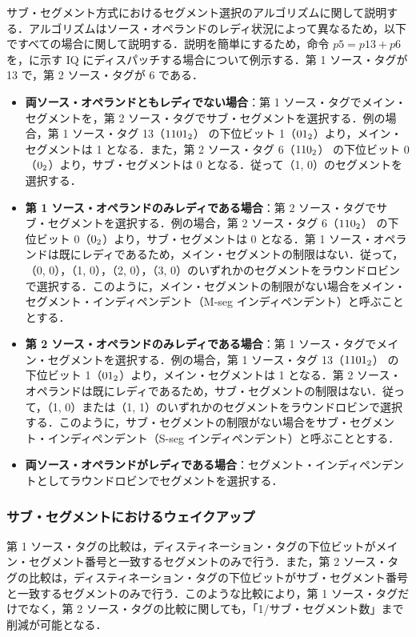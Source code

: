 サブ・セグメント方式におけるセグメント選択のアルゴリズムに関して説明する．アルゴリズムはソース・オペランドのレディ状況によって異なるため，以下ですべての場合に関して説明する．説明を簡単にするため，命令 $p5 = p13 + p6$ を，に示す IQ にディスパッチする場合について例示する．第 1 ソース・タグが 13 で，第 2 ソース・タグが 6 である．
\begin{itemize}
  \item \textbf{両ソース・オペランドともレディでない場合}：第 1 ソース・タグでメイン・セグメントを，第 2 ソース・タグでサブ・セグメントを選択する．例の場合，第 1 ソース・タグ 13（${\rm 1101_2}$） の下位ビット 1（${\rm 01_2}$）より，メイン・セグメントは 1 となる．また，第 2 ソース・タグ 6（${\rm 110_2}$） の下位ビット 0（${\rm 0_2}$）より，サブ・セグメントは 0 となる．従って（1, 0）のセグメントを選択する． 
  \item \textbf{第 1 ソース・オペランドのみレディである場合}：第 2 ソース・タグでサブ・セグメントを選択する．例の場合，第 2 ソース・タグ 6（${\rm 110_2}$） の下位ビット 0（${\rm 0_2}$）より，サブ・セグメントは 0 となる．第 1 ソース・オペランドは既にレディであるため，メイン・セグメントの制限はない．従って，（0, 0），（1, 0），（2, 0），（3, 0）のいずれかのセグメントをラウンドロビンで選択する．このように，メイン・セグメントの制限がない場合をメイン・セグメント・インディペンデント（M-seg インディペンデント）と呼ぶこととする．
  \item \textbf{第 2 ソース・オペランドのみレディである場合}：第 1 ソース・タグでメイン・セグメントを選択する．例の場合，第 1 ソース・タグ 13（${\rm 1101_2}$） の下位ビット 1（${\rm 01_2}$）より，メイン・セグメントは 1 となる．第 2 ソース・オペランドは既にレディであるため，サブ・セグメントの制限はない．従って，（1, 0）または（1, 1）のいずれかのセグメントをラウンドロビンで選択する．このように，サブ・セグメントの制限がない場合をサブ・セグメント・インディペンデント（S-seg インディペンデント）と呼ぶこととする．
  \item \textbf{両ソース・オペランドがレディである場合}：セグメント・インディペンデントとしてラウンドロビンでセグメントを選択する．
\end{itemize}

\subsubsection{サブ・セグメントにおけるウェイクアップ}
第 1 ソース・タグの比較は，ディスティネーション・タグの下位ビットがメイン・セグメント番号と一致するセグメントのみで行う．また，第 2 ソース・タグの比較は，ディスティネーション・タグの下位ビットがサブ・セグメント番号と一致するセグメントのみで行う．このような比較により，第 1 ソース・タグだけでなく，第 2  ソース・タグの比較に関しても，「1/サブ・セグメント数」まで削減が可能となる．

